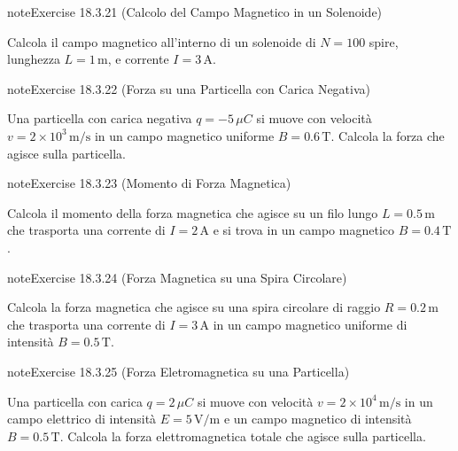 \documentclass[letterpaper,10pt,italian]{jupyterBook}
\begin{document}
\begin{sphinxadmonition}{note}{Exercise 18.3.21 (Calcolo del Campo Magnetico in un Solenoide)}



\sphinxAtStartPar
Calcola il campo magnetico all’interno di un solenoide di \(N = 100\) spire, lunghezza \(L = 1 \, \text{m}\), e corrente \(I = 3 \, \text{A}\).
\end{sphinxadmonition}
 \label{exercise:ch/electromagnetism/electromagnetism-steady-problems-exercise-21}

\begin{sphinxadmonition}{note}{Exercise 18.3.22 (Forza su una Particella con Carica Negativa)}



\sphinxAtStartPar
Una particella con carica negativa \(q = -5 \, \mu C\) si muove con velocità \(v = 2 \times 10^3 \, \text{m/s}\) in un campo magnetico uniforme \(B = 0.6 \, \text{T}\). Calcola la forza che agisce sulla particella.
\end{sphinxadmonition}
 \label{exercise:ch/electromagnetism/electromagnetism-steady-problems-exercise-22}

\begin{sphinxadmonition}{note}{Exercise 18.3.23 (Momento di Forza Magnetica)}



\sphinxAtStartPar
Calcola il momento della forza magnetica che agisce su un filo lungo \(L = 0.5 \, \text{m}\) che trasporta una corrente di \(I = 2 \, \text{A}\) e si trova in un campo magnetico \(B = 0.4 \, \text{T}\).
\end{sphinxadmonition}
 \label{exercise:ch/electromagnetism/electromagnetism-steady-problems-exercise-23}

\begin{sphinxadmonition}{note}{Exercise 18.3.24 (Forza Magnetica su una Spira Circolare)}



\sphinxAtStartPar
Calcola la forza magnetica che agisce su una spira circolare di raggio \(R = 0.2 \, \text{m}\) che trasporta una corrente di \(I = 3 \, \text{A}\) in un campo magnetico uniforme di intensità \(B = 0.5 \, \text{T}\).
\end{sphinxadmonition}
 \label{exercise:ch/electromagnetism/electromagnetism-steady-problems-exercise-24}

\begin{sphinxadmonition}{note}{Exercise 18.3.25 (Forza Eletromagnetica su una Particella)}



\sphinxAtStartPar
Una particella con carica \(q = 2 \, \mu C\) si muove con velocità \(v = 2 \times 10^4 \, \text{m/s}\) in un campo elettrico di intensità \(E = 5 \, \text{V/m}\) e un campo magnetico di intensità \(B = 0.5 \, \text{T}\). Calcola la forza elettromagnetica totale che agisce sulla particella.
\end{sphinxadmonition}
 \label{exercise:ch/electromagnetism/electromagnetism-steady-problems-exercise-25}
\end{document}
